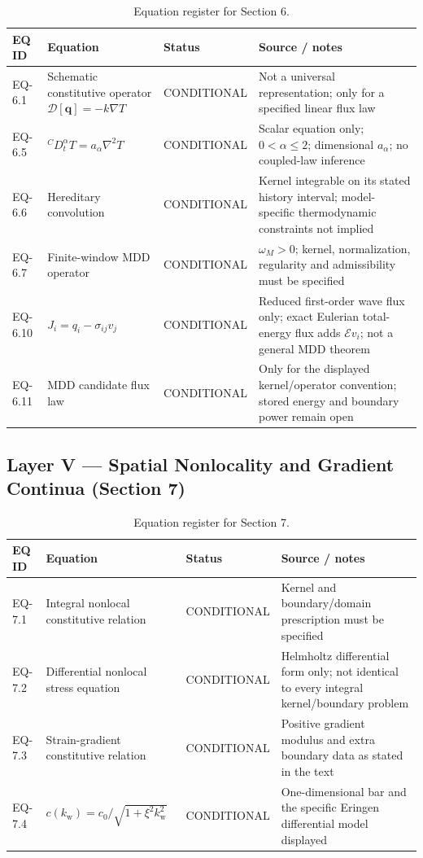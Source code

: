 \begin{table}[htbp]
\centering
\small
\caption{Equation register for Section 6.}
\label{tab:appA-sec6}
\begin{tabularx}{\textwidth}{@{}p{1.6cm}Y p{2.8cm}Y@{}}
\toprule
\textbf{EQ ID} & \textbf{Equation} & \textbf{Status} & \textbf{Source / notes} \\
\midrule
EQ-6.1 & Schematic constitutive operator $\mathcal{D}[\bm q]=-k\nabla T$ & CONDITIONAL & Not a universal representation; only for a specified linear flux law \\
EQ-6.5 & ${}^C D_t^\alpha T=a_\alpha\nabla^2T$ & CONDITIONAL & Scalar equation only; $0<\alpha\leq2$; dimensional $a_\alpha$; no coupled-law inference \\
EQ-6.6 & Hereditary convolution & CONDITIONAL & Kernel integrable on its stated history interval; model-specific thermodynamic constraints not implied \\
EQ-6.7 & Finite-window MDD operator & CONDITIONAL & $\omega_M>0$; kernel, normalization, regularity and admissibility must be specified \\
EQ-6.10 & $J_i=q_i-\sigma_{ij}v_j$ & CONDITIONAL & Reduced first-order wave flux only; exact Eulerian total-energy flux adds $\mathcal{E}v_i$; not a general MDD theorem \\
EQ-6.11 & MDD candidate flux law & CONDITIONAL & Only for the displayed kernel/operator convention; stored energy and boundary power remain open \\
\bottomrule
\end{tabularx}
\end{table}

\subsection{Layer V — Spatial Nonlocality and Gradient Continua (Section 7)}

\begin{table}[htbp]
\centering
\small
\caption{Equation register for Section 7.}
\label{tab:appA-sec7}
\begin{tabularx}{\textwidth}{@{}p{1.6cm}Y p{2.8cm}Y@{}}
\toprule
\textbf{EQ ID} & \textbf{Equation} & \textbf{Status} & \textbf{Source / notes} \\
\midrule
EQ-7.1 & Integral nonlocal constitutive relation & CONDITIONAL & Kernel and boundary/domain prescription must be specified \\
EQ-7.2 & Differential nonlocal stress equation & CONDITIONAL & Helmholtz differential form only; not identical to every integral kernel/boundary problem \\
EQ-7.3 & Strain-gradient constitutive relation & CONDITIONAL & Positive gradient modulus and extra boundary data as stated in the text \\
EQ-7.4 & $c(k_{\mathrm w})=c_0/\sqrt{1+\xi^2k_{\mathrm w}^2}$ & CONDITIONAL & One-dimensional bar and the specific Eringen differential model displayed \\
\bottomrule
\end{tabularx}
\end{table}

